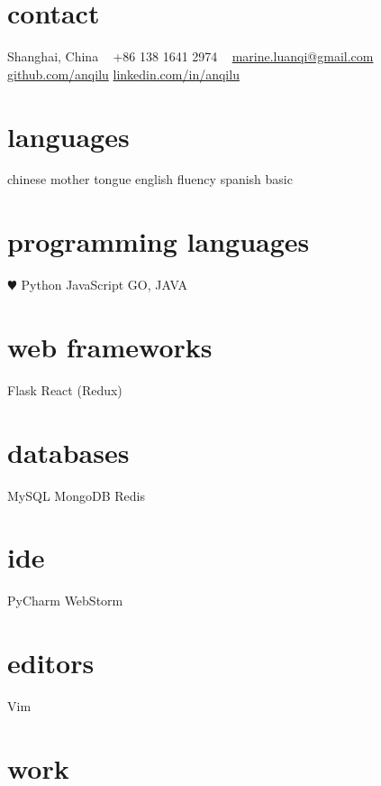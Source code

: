 \documentclass[]{friggeri-cv} %
\begin{document}


\begin{aside} %
\section{contact}
Shanghai, China
~
+86 138 1641 2974
~
\href{mailto:marine.luanqi@gmail.com}{marine.luanqi@gmail.com}
~
\href{https://github.com/anqilu}{github.com/anqilu}
\href{https://www.linkedin.com/in/anqilu}{linkedin.com/in/anqilu}
\section{languages}
chinese mother tongue
english fluency
spanish basic
\section{programming languages}
{\color{red} $\varheartsuit$} Python
JavaScript
GO, JAVA
\section{web frameworks}
Flask
React (Redux)
\section{databases}
MySQL
MongoDB
Redis
\section{ide}
PyCharm
WebStorm
\section{editors}
Vim
\end{aside}

\section{work}
\end{document}
